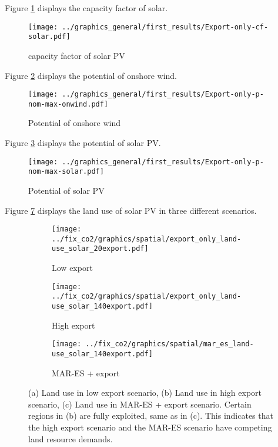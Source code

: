 
Figure \ref{fig:cf-solar} displays the capacity factor of solar.

\begin{figure}[h!]
    \centering
    \texttt{[image: ../graphics\_general/first\_results/Export-only-cf-solar.pdf]}
    \caption{capacity factor of solar PV}
    \label{fig:cf-solar}
\end{figure}


Figure \ref{fig:p-nom-max-onwind} displays the potential of onshore wind.

\begin{figure}[h!]
    \centering
    \texttt{[image: ../graphics\_general/first\_results/Export-only-p-nom-max-onwind.pdf]}
    \caption{Potential of onshore wind}
    \label{fig:p-nom-max-onwind}
\end{figure}


Figure \ref{fig:p-nom-max-solar} displays the potential of solar PV.

\begin{figure}[h!]
    \centering
    \texttt{[image: ../graphics\_general/first\_results/Export-only-p-nom-max-solar.pdf]}
    \caption{Potential of solar PV}
    \label{fig:p-nom-max-solar}
\end{figure}


Figure \ref{fig:land_use_solar} displays the land use of solar PV in three different scenarios.

\begin{figure}[h]
    \centering
    \begin{subfigure}[b]{0.3\textwidth}
        \texttt{[image: ../fix\_co2/graphics/spatial/export\_only\_land-use\_solar\_20export.pdf]}
        \caption{Low export}
        \label{fig:graphic1}
    \end{subfigure}
    \begin{subfigure}[b]{0.3\textwidth}
        \texttt{[image: ../fix\_co2/graphics/spatial/export\_only\_land-use\_solar\_140export.pdf]}
        \caption{High export}
        \label{fig:graphic2}
    \end{subfigure}
    \begin{subfigure}[b]{0.3\textwidth}
        \texttt{[image: ../fix\_co2/graphics/spatial/mar\_es\_land-use\_solar\_140export.pdf]}
        \caption{MAR-ES + export}
        \label{fig:graphic3}
    \end{subfigure}
    \caption{(a) Land use in low export scenario, (b) Land use in high export scenario, (c) Land use in MAR-ES + export scenario. Certain regions in
    (b) are fully exploited, same as in (c). This indicates that the high export scenario and the MAR-ES scenario have competing land resource demands.}
    \label{fig:land_use_solar}
\end{figure}
    
